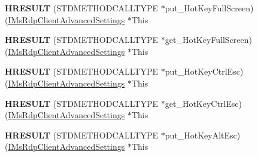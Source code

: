 \begin{DoxyCompactItemize}
\item 
\mbox{\label{struct_m_s_t_s_c_lib_1_1_i_ms_rdp_client_advanced_settings_vtbl_aa89f8fa806a19c4e2c992a931e40eef8}} 
{\bfseries H\+R\+E\+S\+U\+LT} (S\+T\+D\+M\+E\+T\+H\+O\+D\+C\+A\+L\+L\+T\+Y\+PE $\ast$put\+\_\+\+Hot\+Key\+Full\+Screen)(\hyperlink{interface_m_s_t_s_c_lib_1_1_i_ms_rdp_client_advanced_settings}{I\+Ms\+Rdp\+Client\+Advanced\+Settings} $\ast$This
\item 
\mbox{\label{struct_m_s_t_s_c_lib_1_1_i_ms_rdp_client_advanced_settings_vtbl_a78e124be50447064bcf2c87c652d38d5}} 
{\bfseries H\+R\+E\+S\+U\+LT} (S\+T\+D\+M\+E\+T\+H\+O\+D\+C\+A\+L\+L\+T\+Y\+PE $\ast$get\+\_\+\+Hot\+Key\+Full\+Screen)(\hyperlink{interface_m_s_t_s_c_lib_1_1_i_ms_rdp_client_advanced_settings}{I\+Ms\+Rdp\+Client\+Advanced\+Settings} $\ast$This
\item 
\mbox{\label{struct_m_s_t_s_c_lib_1_1_i_ms_rdp_client_advanced_settings_vtbl_a4519f88c9aead5fcc98555e98ede807b}} 
{\bfseries H\+R\+E\+S\+U\+LT} (S\+T\+D\+M\+E\+T\+H\+O\+D\+C\+A\+L\+L\+T\+Y\+PE $\ast$put\+\_\+\+Hot\+Key\+Ctrl\+Esc)(\hyperlink{interface_m_s_t_s_c_lib_1_1_i_ms_rdp_client_advanced_settings}{I\+Ms\+Rdp\+Client\+Advanced\+Settings} $\ast$This
\item 
\mbox{\label{struct_m_s_t_s_c_lib_1_1_i_ms_rdp_client_advanced_settings_vtbl_a6b71f2ae0f89412188b1fc45188d0d5a}} 
{\bfseries H\+R\+E\+S\+U\+LT} (S\+T\+D\+M\+E\+T\+H\+O\+D\+C\+A\+L\+L\+T\+Y\+PE $\ast$get\+\_\+\+Hot\+Key\+Ctrl\+Esc)(\hyperlink{interface_m_s_t_s_c_lib_1_1_i_ms_rdp_client_advanced_settings}{I\+Ms\+Rdp\+Client\+Advanced\+Settings} $\ast$This
\item 
\mbox{\label{struct_m_s_t_s_c_lib_1_1_i_ms_rdp_client_advanced_settings_vtbl_ad28d8560d518df37489fda12fa94b517}} 
{\bfseries H\+R\+E\+S\+U\+LT} (S\+T\+D\+M\+E\+T\+H\+O\+D\+C\+A\+L\+L\+T\+Y\+PE $\ast$put\+\_\+\+Hot\+Key\+Alt\+Esc)(\hyperlink{interface_m_s_t_s_c_lib_1_1_i_ms_rdp_client_advanced_settings}{I\+Ms\+Rdp\+Client\+Advanced\+Settings} $\ast$This
\item 

\end{DoxyCompactItemize}

